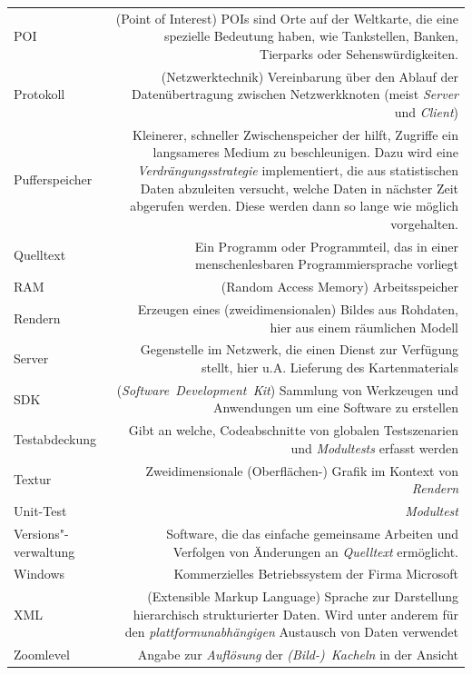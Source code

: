 \documentclass[10pt]{scrreprt}
\newcommand{\textref}[1]{\mbox{\raisebox{0.1ex}{\small$\rightarrow$ }\textit{#1}}}
\begin{document}
\begin{longtabu}{L{0.35} R{1.65}}
POI & (Point of Interest) POIs sind Orte auf der Weltkarte, die eine spezielle Bedeutung haben, wie Tankstellen, Banken, Tierparks oder Sehenswürdigkeiten.\\
Protokoll & (Netzwerktechnik) Vereinbarung über den Ablauf der Datenübertragung zwischen Netzwerkknoten (meist \textref{Server} und \textref{Client})\\
Pufferspeicher & Kleinerer, schneller Zwischenspeicher der hilft, Zugriffe ein langsameres Medium zu beschleunigen. Dazu wird eine \textit{Verdrängungsstrategie} implementiert, die aus statistischen Daten abzuleiten versucht, welche Daten in nächster Zeit abgerufen werden. Diese werden dann so lange wie möglich vorgehalten.\\
Quelltext & Ein Programm oder Programmteil, das in einer menschenlesbaren Programmiersprache vorliegt\\
RAM & (Random Access Memory) Arbeitsspeicher\\
Rendern & Erzeugen eines (zweidimensionalen) Bildes aus Rohdaten, hier aus einem räumlichen Modell\\
Server & Gegenstelle im Netzwerk, die einen Dienst zur Verfügung stellt, hier u.A. Lieferung des Kartenmaterials\\
SDK & (\textref{Software Development Kit}) Sammlung von Werkzeugen und Anwendungen um eine Software zu erstellen\\
Testabdeckung & Gibt an welche, Codeabschnitte von globalen Testszenarien und \textref{Modultests} erfasst werden \\
Textur & Zweidimensionale (Oberflächen-) Grafik im Kontext von \textref{Rendern}\\
Unit-Test & \textref{Modultest}\\
Versions"-verwaltung & Software, die das einfache gemeinsame Arbeiten und Verfolgen von Änderungen an \textref{Quelltext} ermöglicht.\\
Windows & Kommerzielles Betriebssystem der Firma Microsoft\\
XML & (Extensible Markup Language) Sprache zur Darstellung hierarchisch strukturierter Daten. Wird unter anderem für den \textref{plattformunabhängigen} Austausch von Daten verwendet\\
Zoomlevel & Angabe zur \textref{Auflösung} der \textref{(Bild-) Kacheln} in der Ansicht\\
\end{longtabu}
\end{document}
